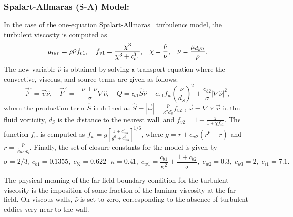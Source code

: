 \subsubsection*{Spalart-Allmaras (S-A) Model:}
In the case of the one-equation Spalart-Allmaras~\cite{spalart1992} turbulence model, the turbulent viscosity is computed as
\begin{equation} \label{eq nutur}
\mu _{tur}=\rho \hat{\nu}f_{v1},\quad f_{v1}=\frac{\chi ^{3}}{\chi ^{3}+c_{v1}^{3}}\mbox{,}\quad \chi =\frac{%
\hat{\nu}}{\nu }\mbox{,}\quad \nu =\frac{\mu _{dyn}}{\rho }.
\end{equation}
The new variable $\hat \nu$ is obtained by solving a transport equation where the convective, viscous, and source terms are given as follows:
\begin{equation} \label{eq:tersa0}
\vec F^{c} =  \vec v\hat{\nu},\quad
\vec F^{v} =  - \frac{\nu +\hat{\nu}}{\sigma }\nabla\hat{\nu},\quad
Q =  c_{b1}\hat{S}\hat{\nu}-c_{w1}f_{w}\left( \frac{\hat{\nu}}{d_{S}}\right) ^{2}+\frac{c_{b2}}{\sigma } |\nabla \hat{\nu}|^{2},
\end{equation}
where the production term $\hat S$ is defined as $\hat{S} = |\vec \omega| +\frac{\hat{\nu}}{\kappa ^{2}d_{S}^{2}}f_{v2}$ , $\vec \omega= \nabla \times \vec v$ is the fluid vorticity, $d_{S}$ is the distance to the nearest wall, and $f_{v2}=1-\frac{\chi }{1+\chi f_{v1}}$. The function $f_{w}$ is computed as $f_{w}=g\left[ \frac{1+c_{w3}^{6}}{g^{6}+c_{w3}^{6}}\right] ^{1/6}$, where $g=r+c_{w2}(r^{6}-r)$ and $r=\frac{\hat{\nu}}{\hat{S}\kappa ^{2}d_{S}^{2}}$. Finally, the set of closure constants for the model is given by 
\begin{equation}
\sigma =2/3,\;  c_{b1}=0.1355,\; c_{b2}=0.622,\; \kappa =0.41, \;c_{w1}=\frac{c_{b1}}{\kappa^2}+\frac{1+c_{b2}}{\sigma}, \; c_{w2}=0.3, \; c_{w3}=2, \; c_{v1}=7.1. 
\end{equation}

The physical meaning of the far-field boundary condition for the turbulent viscosity is the imposition of some fraction of the laminar viscosity at the far-field. On viscous walls, $\hat{\nu}$ is set to zero, corresponding to the absence of turbulent eddies very near to the wall.
